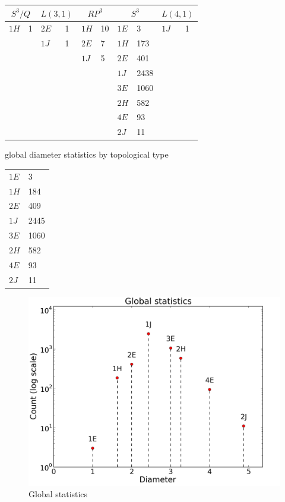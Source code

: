 \documentclass[12pt]{article}
\begin{document}
\begin{tabular} {| l l | l l | l l | l l | l l |}
\hline
\multicolumn{2}{|c|}{$S^{3}/Q$} &
\multicolumn{2}{|c|}{$L(3,1)$} &
\multicolumn{2}{|c|}{$RP^{3}$} &
\multicolumn{2}{|c|}{$S^{3}$} &
\multicolumn{2}{|c|}{$L(4,1)$} \\
\hline
\hline
$1H$&1    &$2E$&1    &$1H$&10    &$1E$&3    &$1J$&1 \\
  &       &$1J$&1    &$2E$&7     &$1H$&173  &    &  \\
  &       &  &       &$1J$&5     &$2E$&401  &    &  \\
  &       &  &       &    &      &$1J$&2438 &    &  \\
  &       &  &       &    &      &$3E$&1060 &    &  \\
  &       &  &       &    &      &$2H$&582  &    &  \\
  &       &  &       &    &      &$4E$&93   &    &  \\
  &       &  &       &    &      &$2J$&11   &    &  \\
\hline
\end{tabular}

global diameter statistics by topological type

\begin{tabular} {| l l |}
\hline
$1E$ &       3\\
$1H$ &       184\\
$2E$ &       409\\
$1J$ &       2445\\
$3E$ &       1060\\
$2H$ &       582\\
$4E$ &       93\\
$2J$ &       11\\
\hline
\end{tabular}


\begin{figure}
    \begin{center}
    \includegraphics[width=0.6\linewidth]{figures/global_statistics.png}
    \caption{Global statistics}
    \end{center}
\end{figure}



\end{document}

